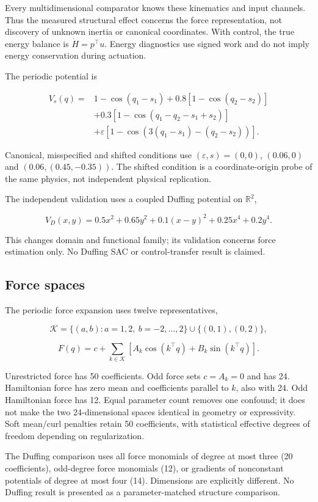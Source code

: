 \documentclass[
  10pt,
]{article}
\begin{document}
Every multidimensional comparator knows these kinematics and input
channels. Thus the measured structural effect concerns the force
representation, not discovery of unknown inertia or canonical
coordinates. With control, the true energy balance is
\(\dot H=p^\top u\). Energy diagnostics use signed work and do not imply
energy conservation during actuation.

The periodic potential is

\[\begin{aligned}
V_s(q)={}&1-\cos(q_1-s_1)+0.8[1-\cos(q_2-s_2)]\\
&+0.3[1-\cos(q_1-q_2-s_1+s_2)]\\
&+\varepsilon[1-\cos(3(q_1-s_1)-(q_2-s_2))].
\end{aligned}\]

Canonical, misspecified and shifted conditions use
\((\varepsilon,s)=(0,0)\), \((0.06,0)\) and \((0.06,(0.45,-0.35))\). The
shifted condition is a coordinate-origin probe of the same physics, not
independent physical replication.

The independent validation uses a coupled Duffing potential on
\(\mathbb R^2\),

\[V_D(x,y)=0.5x^2+0.65y^2+0.1(x-y)^2+0.25x^4+0.2y^4.\]

This changes domain and functional family; its validation concerns force
estimation only. No Duffing SAC or control-transfer result is claimed.

\hypertarget{force-spaces}{%
\subsection{Force spaces}\label{force-spaces}}

The periodic force expansion uses twelve representatives,

\[\mathcal K=\{(a,b):a=1,2,\ b=-2,\ldots,2\}\cup\{(0,1),(0,2)\},\]

\[F(q)=c+\sum_{k\in\mathcal K}[A_k\cos(k^\top q)+B_k\sin(k^\top q)].\]

Unrestricted force has 50 coefficients. Odd force sets \(c=A_k=0\) and
has 24. Hamiltonian force has zero mean and coefficients parallel to
\(k\), also with 24. Odd Hamiltonian force has 12. Equal parameter count
removes one confound; it does not make the two 24-dimensional spaces
identical in geometry or expressivity. Soft mean/curl penalties retain
50 coefficients, with statistical effective degrees of freedom depending
on regularization.

The Duffing comparison uses all force monomials of degree at most three
(20 coefficients), odd-degree force monomials (12), or gradients of
nonconstant potentials of degree at most four (14). Dimensions are
explicitly different. No Duffing result is presented as a
parameter-matched structure comparison.
\end{document}
